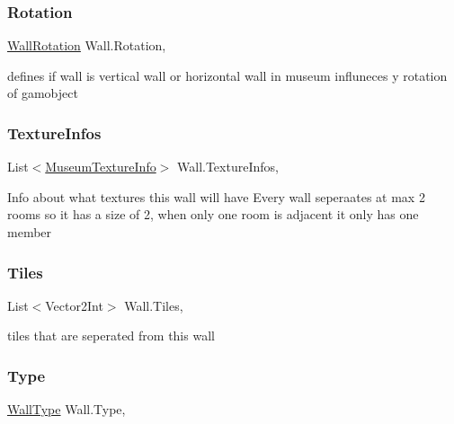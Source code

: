 \subsubsection{\texorpdfstring{Rotation}{Rotation}}
{\footnotesize\ttfamily \mbox{\hyperlink{class_wall_a0ff16a0e73bfc8f0d89c5fd6849e3a97}{Wall\+Rotation}} Wall.\+Rotation\hspace{0.3cm}{\ttfamily [get]}, {}}



defines if wall is vertical wall or horizontal wall in museum influneces y rotation of gamobject 

\mbox{\label{class_wall_adc37331462fd06077dbef80e89f5be89}} 
\subsubsection{\texorpdfstring{Texture\+Infos}{TextureInfos}}
{\footnotesize\ttfamily List$<$\mbox{\hyperlink{class_museum_texture_info}{Museum\+Texture\+Info}}$>$ Wall.\+Texture\+Infos\hspace{0.3cm}{\ttfamily [get]}, {}}



Info about what textures this wall will have Every wall seperaates at max 2 rooms so it has a size of 2, when only one room is adjacent it only has one member 

\mbox{\label{class_wall_a1e5fab93aa7e8676dd65a61a26b28513}} 
\subsubsection{\texorpdfstring{Tiles}{Tiles}}
{\footnotesize\ttfamily List$<$Vector2\+Int$>$ Wall.\+Tiles\hspace{0.3cm}{\ttfamily [get]}, {}}



tiles that are seperated from this wall 

\mbox{\label{class_wall_ade4c1924f35fd33637a3cdfa31566af0}} 
\subsubsection{\texorpdfstring{Type}{Type}}
{\footnotesize\ttfamily \mbox{\hyperlink{class_wall_a1366d94ac70428624a6703d7db89638d}{Wall\+Type}} Wall.\+Type\hspace{0.3cm}{\ttfamily [get]}, {}}



